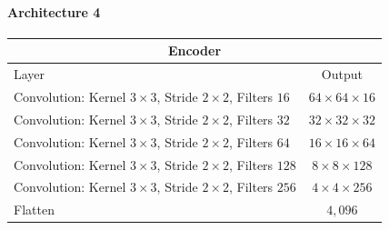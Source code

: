\paragraph{Architecture 4}

\begin{center}
    \begin{table}[H]
        \centering
        \begin{tabular}{ | l | c | }
            \multicolumn{2}{c}{Encoder} \\ \hline
            Layer & Output\\ \hline
            Convolution: Kernel $3\times3$, Stride $2\times2$, Filters $16 $    & $64\times 64\times 16 $    \\  
            Convolution: Kernel $3\times3$, Stride $2\times2$, Filters $32 $    & $32\times 32\times 32 $    \\
            Convolution: Kernel $3\times3$, Stride $2\times2$, Filters $64 $    & $16\times 16\times 64 $    \\
            Convolution: Kernel $3\times3$, Stride $2\times2$, Filters $128$    & $8\times 8\times   128$    \\
            Convolution: Kernel $3\times3$, Stride $2\times2$, Filters $256$    & $4\times 4\times   256$    \\
            Flatten                                                             & $4,096$                    \\
            \hline
        \end{tabular} 
    \end{table}
\end{center}
\vspace{-4em}
